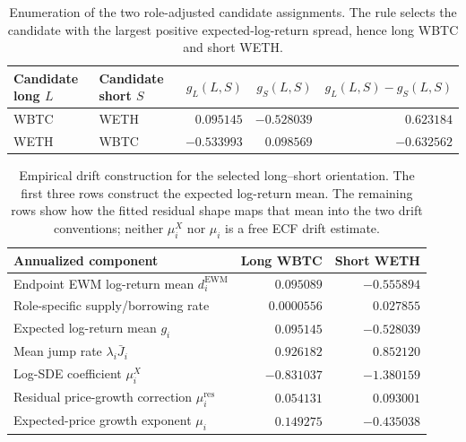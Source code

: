 \documentclass[11pt]{article}
\newif\ifshowresultscriptpaths
\newcommand{\resultscript}[1]{%
  \ifshowresultscriptpaths
    \par\smallskip
    {\raggedright\footnotesize\itshape Result-generation script: \path{#1}\par}%
  \fi
}
\begin{document}
\begin{table}[ht]
\centering
\small
\begin{tabular}{llrrr}
\toprule
Candidate long $L$ & Candidate short $S$
& $g_L(L,S)$ & $g_S(L,S)$
& $g_L(L,S)-g_S(L,S)$ \\
\midrule
WBTC & WETH & $0.095145$ & $-0.528039$ & $0.623184$ \\
WETH & WBTC & $-0.533993$ & $0.098569$ & $-0.632562$ \\
\bottomrule
\end{tabular}
\caption{Enumeration of the two role-adjusted candidate assignments. The rule selects the
candidate with the largest positive expected-log-return spread, hence long WBTC and short
WETH.}
\label{tab:note-orientation-output}
\resultscript{jobs/calibrate_eth_btc.py}
\end{table}

\begin{table}[ht]
\centering
\small
\begin{tabular}{lrr}
\toprule
Annualized component & Long WBTC & Short WETH \\
\midrule
Endpoint EWM log-return mean $d_i^{\mathrm{EWM}}$ & $0.095089$ & $-0.555894$ \\
Role-specific supply/borrowing rate & $0.0000556$ & $0.027855$ \\
Expected log-return mean $g_i$ & $0.095145$ & $-0.528039$ \\
Mean jump rate $\lambda_i\bar J_i$ & $0.926182$ & $0.852120$ \\
Log-SDE coefficient $\mu_i^X$ & $-0.831037$ & $-1.380159$ \\
Residual price-growth correction $\mu_i^{\mathrm{res}}$ & $0.054131$ & $0.093001$ \\
Expected-price growth exponent $\mu_i$ & $0.149275$ & $-0.435038$ \\
\bottomrule
\end{tabular}
\caption{Empirical drift construction for the selected long--short orientation. The
first three rows construct the expected log-return mean. The remaining rows show how the
fitted residual shape maps that mean into the two drift conventions; neither $\mu_i^X$ nor
$\mu_i$ is a free ECF drift estimate.}
\label{tab:note-drift-output}
\resultscript{jobs/calibrate_eth_btc.py}
\end{table}
\end{document}
